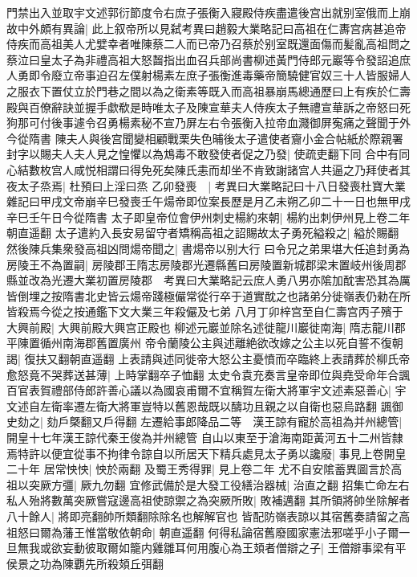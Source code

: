 門禁出入並取宇文述郭衍節度令右庶子張衡入寢殿侍疾盡遣後宫出就别室俄而上崩故中外頗有異論|{
	此上叙帝所以見弑考異曰趙毅大業略記曰高祖在仁夀宫病甚追帝侍疾而高祖美人尤嬖幸者唯陳蔡二人而已帝乃召蔡於别室既還面傷而髪亂高祖問之蔡泣曰皇太子為非禮高祖大怒齧指出血召兵部尚書柳述黃門侍郎元巖等令發詔追庶人勇即令廢立帝事迫召左僕射楊素左庶子張衡進毒藥帝簡驍健官奴三十人皆服婦人之服衣下置仗立於門巷之間以為之衛素等既入而高祖暴崩馬總通歷曰上有疾於仁壽殿與百僚辭訣並握手歔欷是時唯太子及陳宣華夫人侍疾太子無禮宣華訴之帝怒曰死狗那可付後事遽令召勇楊素秘不宣乃屏左右令張衡入拉帝血濺御屏寃痛之聲聞于外今從隋書}
陳夫人與後宫聞變相顧戰栗失色晡後太子遣使者齎小金合帖紙於際親署封字以賜夫人夫人見之惶懼以為鴆毒不敢發使者促之乃發|{
	使疏吏翻下同}
合中有同心結數枚宫人咸悦相謂曰得免死矣陳氏恚而却坐不肯致謝諸宫人共逼之乃拜使者其夜太子烝焉|{
	杜預曰上淫曰烝}
乙卯發喪　|{
	考異曰大業略記曰十八日發喪杜寶大業雜記曰甲戌文帝崩辛巳發喪壬午煬帝即位案長歷是月乙未朔乙卯二十一日也無甲戌辛巳壬午日今從隋書}
太子即皇帝位會伊州刺史楊約來朝|{
	楊約出刺伊州見上卷二年朝直遥翻}
太子遣約入長安易留守者矯稱高祖之詔賜故太子勇死縊殺之|{
	縊於賜翻}
然後陳兵集衆發高祖凶問煬帝聞之|{
	書煬帝以别大行}
曰令兄之弟果堪大任追封勇為房陵王不為置嗣|{
	房陵郡王隋志房陵郡光遷縣舊曰房陵置新城郡梁末置岐州後周郡縣並改為光遷大業初置房陵郡　考異曰大業略記云庶人勇八男亦隂加酖害恐其為厲皆倒埋之按隋書北史皆云煬帝踐極儼常從行卒于道實酖之也諸弟分徙嶺表仍勑在所皆殺焉今從之按通鑑下文大業三年殺儼及七弟}
八月丁卯梓宫至自仁壽宫丙子殯于大興前殿|{
	大興前殿大興宫正殿也}
柳述元巖並除名述徙龍川巖徙南海|{
	隋志龍川郡平陳置循州南海郡舊置廣州}
帝令蘭陵公主與述離絶欲改嫁之公主以死自誓不復朝謁|{
	復扶又翻朝直遥翻}
上表請與述同徙帝大怒公主憂憤而卒臨終上表請葬於柳氏帝愈怒竟不哭葬送甚薄|{
	上時掌翻卒子恤翻}
太史令袁充奏言皇帝即位與堯受命年合諷百官表賀禮部侍郎許善心議以為國哀甫爾不宜稱賀左衛大將軍宇文述素惡善心|{
	宇文述自左衛率遷左衛大將軍豈特以舊恩哉既以醻功且親之以自衛也惡烏路翻}
諷御史劾之|{
	劾戶槩翻又戶得翻}
左遷給事郎降品二等　漢王諒有寵於高祖為并州總管|{
	開皇十七年漢王諒代秦王俊為并州總管}
自山以東至于滄海南距黃河五十二州皆隸焉特許以便宜從事不拘律令諒自以所居天下精兵處見太子勇以讒廢|{
	事見上卷開皇二十年}
居常怏怏|{
	怏於兩翻}
及蜀王秀得罪|{
	見上卷二年}
尤不自安隂蓄異圖言於高祖以突厥方彊|{
	厥九勿翻}
宜修武備於是大發工役繕治器械|{
	治直之翻}
招集亡命左右私人殆將數萬突厥嘗寇邊高祖使諒禦之為突厥所敗|{
	敗補邁翻}
其所領將帥坐除解者八十餘人|{
	將即亮翻帥所類翻除除名也解解官也}
皆配防嶺表諒以其宿舊奏請留之高祖怒曰爾為藩王惟當敬依朝命|{
	朝直遥翻}
何得私論宿舊廢國家憲法邪嗟乎小子爾一旦無我或欲妄動彼取爾如籠内雞雛耳何用腹心為王頍者僧辯之子|{
	王僧辯事梁有平侯景之功為陳覇先所殺頍丘弭翻}
